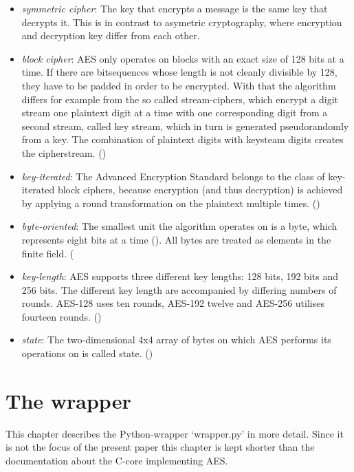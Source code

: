 \begin{itemize}

\item
  \emph{symmetric cipher}: The key that encrypts a message is the same
  key that decrypts it. This is in contrast to asymetric cryptography,
  where encryption and decryption key differ from each other.
\item
  \emph{block cipher}: AES only operates on blocks with an exact size of
  128 bits at a time. If there are bitsequences whose length is not
  cleanly divisible by 128, they have to be padded in order to be
  encrypted. With that the algorithm differs for example from the so
  called stream-ciphers, which encrypt a digit stream one plaintext
  digit at a time with one corresponding digit from a second stream,
  called key stream, which in turn is generated pseudorandomly from a
  key. The combination of plaintext digits with keysteam digits creates
  the cipherstream. (\cite[p. 33-34]{paar 33-34})
\item
  \emph{key-iterated}: The Advanced Encryption Standard belongs to the
  class of key-iterated block ciphers, because encryption (and thus
  decryption) is achieved by applying a round transformation on the
  plaintext multiple times. (\cite[p. 33]{rijndael})
\item
  \emph{byte-oriented}: The smallest unit the algorithm operates on is a
  byte, which represents eight bits at a time (\cite[p. 14]{fips197}). All bytes
  are treated as elements in the finite field. (\cite[p. 10]{fips197}
\item
  \emph{key-length}: AES supports three different key lengths: 128 bits,
  192 bits and 256 bits. The different key length are accompanied by
  differing numbers of rounds. AES-128 uses ten rounds, AES-192 twelve
  and AES-256 utilises fourteen rounds. (\cite[p. 14]{fips197})
\item
  \emph{state}: The two-dimensional 4x4 array of bytes on which AES
  performs its operations on is called state. (\cite[p. 9]{fips197})
\end{itemize}

\hypertarget{the-wrapper}{%
\section{The wrapper}\label{the-wrapper}}

This chapter describes the Python-wrapper `wrapper.py' in more detail.
Since it is not the focus of the present paper this chapter is kept
shorter than the documentation about the C-core implementing AES.

